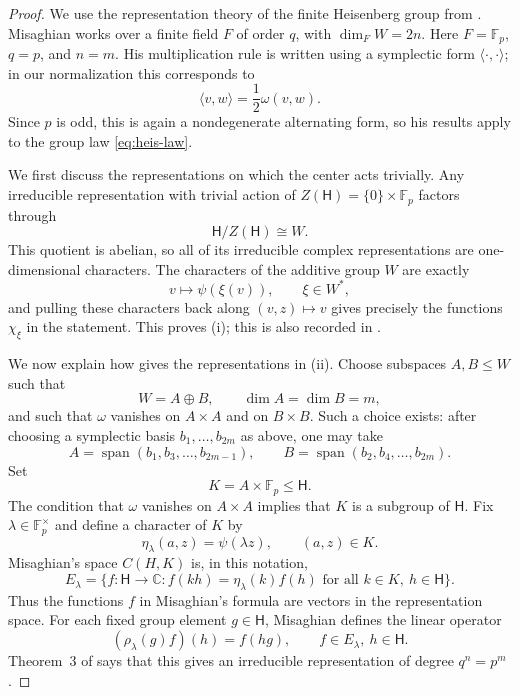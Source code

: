 \documentclass[11pt, reqno]{amsart}
\numberwithin{equation}{section}
\newcommand{\Fp}{\mathbb F_p}
\newcommand{\C}{\mathbb C}
\newcommand{\Heis}{\mathsf H}
\newcommand{\Span}{\operatorname{span}}
\begin{document}
\begin{proof}
We use the representation theory of the finite Heisenberg group from
\cite{Misaghian2010}.  Misaghian works over a finite field $F$ of order
$q$, with $\dim_F W=2n$.  Here $F=\Fp$, $q=p$, and $n=m$.  His
multiplication rule is written using a symplectic form
$\langle\cdot,\cdot\rangle$; in our normalization this corresponds to
\[
    \langle v,w\rangle=\frac12\omega(v,w).
\]
Since $p$ is odd, this is again a nondegenerate alternating form, so his
results apply to the group law \eqref{eq:heis-law}.

We first discuss the representations on which the center acts trivially.  Any
irreducible representation with trivial action of $Z(\Heis)=\{0\}\times\Fp$
factors through
\[
    \Heis/Z(\Heis)\cong W.
\]
This quotient is abelian, so all of its irreducible complex representations are
one-dimensional characters.  The characters of the additive group $W$ are
exactly
\[
    v\mapsto \psi(\xi(v)),\qquad \xi\in W^*,
\]
and pulling these characters back along $(v,z)\mapsto v$ gives precisely the
functions $\chi_\xi$ in the statement.  This proves \textup{(i)}; this is also
recorded in \cite[Lemmas~5--6, Theorem~2, and Corollary~5,
pp.~164--166]{Misaghian2010}.

We now explain how \cite[Theorem~3]{Misaghian2010} gives the representations
in \textup{(ii)}.  Choose subspaces $A,B\le W$ such that
\[
    W=A\oplus B,\qquad \dim A=\dim B=m,
\]
and such that $\omega$ vanishes on $A\times A$ and on $B\times B$.  Such a
choice exists: after choosing a symplectic basis
$b_1,\ldots,b_{2m}$ as above, one may take
\[
    A=\Span(b_1,b_3,\ldots,b_{2m-1}),\qquad
    B=\Span(b_2,b_4,\ldots,b_{2m}).
\]
Set
\[
    K=A\times\Fp\le \Heis.
\]
The condition that $\omega$ vanishes on $A\times A$ implies that $K$ is a
subgroup of $\Heis$.  Fix $\lambda\in\Fp^\times$ and define a character of $K$ by
\[
    \eta_\lambda(a,z)=\psi(\lambda z),\qquad (a,z)\in K.
\]
Misaghian's space $C(H,K)$ is, in this notation,
\[
    E_\lambda
    =\{f:\Heis\to\C:
        f(kh)=\eta_\lambda(k)f(h)
        \text{ for all } k\in K,\ h\in \Heis\}.
\]
Thus the functions $f$ in Misaghian's formula are vectors in the representation
space.  For each fixed group element $g\in\Heis$, Misaghian defines the linear
operator
\[
    (\rho_\lambda(g)f)(h)=f(hg),\qquad f\in E_\lambda,\ h\in\Heis.
\]
Theorem~3 of \cite{Misaghian2010} says that this gives an irreducible
representation of degree $q^n=p^m$.


\end{proof}
\end{document}
